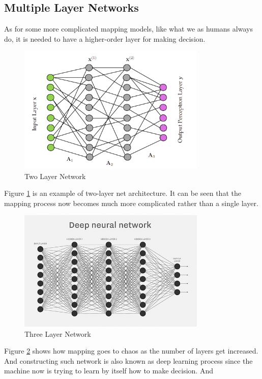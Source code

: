 \documentclass[preprint,12pt]{elsarticle}
\begin{document}
        \subsection{Multiple Layer Networks}
        As for some more complicated mapping models, like what we as humans always do, it is needed to have a higher-order
        layer for making decision.
        \begin{figure}[h]
            \center
            \includegraphics[width = 0.8\textwidth]{arc.PNG}
            \caption{Two Layer Network}
            \label{fig:2}
        \end{figure}
        Figure \ref{fig:2} is an example of two-layer net architecture. It can be seen that the mapping process now becomes
        much more complicated rather than a single layer. 
        \begin{figure}[h]
            \center
            \includegraphics[width = 0.8\textwidth]{nn.jpg}
            \caption{Three Layer Network}
            \label{fig:3}
        \end{figure}
        Figure \ref{fig:3} shows how mapping goes to chaos as the number of layers get increased. And constructing such network is
        also known as deep learning process since the machine now is trying to learn by itself how to make decision. And 
\end{document}

